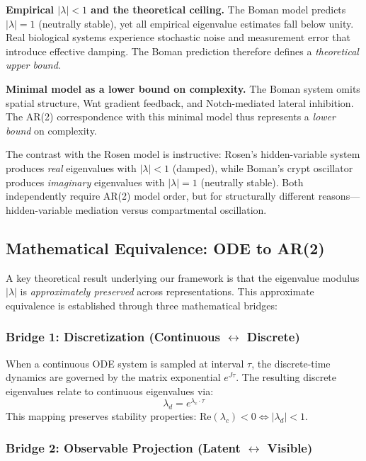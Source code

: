 \documentclass[11pt,a4paper]{article}
\begin{document}
\textbf{Empirical $|\lambda| < 1$ and the theoretical ceiling.} The Boman model predicts $|\lambda| = 1$ (neutrally stable), yet all empirical eigenvalue estimates fall below unity. Real biological systems experience stochastic noise and measurement error that introduce effective damping. The Boman prediction therefore defines a \textit{theoretical upper bound}.

\textbf{Minimal model as a lower bound on complexity.} The Boman system omits spatial structure, Wnt gradient feedback, and Notch-mediated lateral inhibition. The AR(2) correspondence with this minimal model thus represents a \textit{lower bound} on complexity.

The contrast with the Rosen model is instructive: Rosen's hidden-variable system produces \textit{real} eigenvalues with $|\lambda| < 1$ (damped), while Boman's crypt oscillator produces \textit{imaginary} eigenvalues with $|\lambda| = 1$ (neutrally stable). Both independently require AR(2) model order, but for structurally different reasons---hidden-variable mediation versus compartmental oscillation.

\subsection{Mathematical Equivalence: ODE to AR(2)}

A key theoretical result underlying our framework is that the eigenvalue modulus $|\lambda|$ is \textit{approximately preserved} across representations. This approximate equivalence is established through three mathematical bridges:

\subsubsection*{Bridge 1: Discretization (Continuous $\leftrightarrow$ Discrete)}

When a continuous ODE system is sampled at interval $\tau$, the discrete-time dynamics are governed by the matrix exponential $e^{J\tau}$. The resulting discrete eigenvalues relate to continuous eigenvalues via:
\begin{equation}
\lambda_d = e^{\lambda_c \cdot \tau}
\label{eq:eigenvalue_mapping}
\end{equation}
This mapping preserves stability properties: $\text{Re}(\lambda_c) < 0 \Leftrightarrow |\lambda_d| < 1$.

\subsubsection*{Bridge 2: Observable Projection (Latent $\leftrightarrow$ Visible)}
\end{document}
